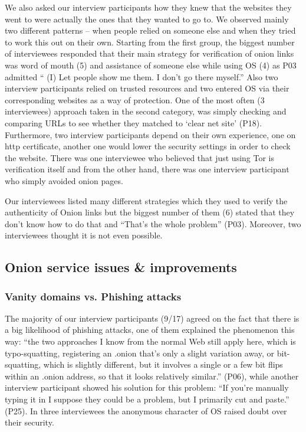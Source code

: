 We also asked our interview participants how they knew that the websites they went to were actually the ones that they wanted to go to.  We observed mainly two different patterns – when people relied on someone else and when they tried to work this out on their own. Starting from the first group, the biggest number of interviewees responded that their main strategy for verification of onion links was word of mouth (5) and assistance of someone else while using OS (4) as P03 admitted “ (I) Let people show me them. I don't go there myself.” Also two interview participants relied on trusted resources and two entered OS via their corresponding websites as a way of protection. One of the most often (3 interviewees) approach taken in the second category, was simply checking and comparing URLs to see whether they matched to ‘clear net site’ (P18). Furthermore, two interview participants depend on their own experience, one on http certificate, another one would lower the security settings in order to check the website. There was one interviewee who believed that just using Tor is verification itself and from the other hand, there was one interview participant who simply avoided onion pages.

Our interviewees listed many different strategies which they used to verify the authenticity of Onion links but the biggest number of them (6) stated that they don’t know how to do that and “That’s the whole problem” (P03). Moreover, two interviewees thought it is not even possible.


\subsection{Onion service issues \& improvements}
\label{sec:improve}

\subsubsection{Vanity domains vs. Phishing attacks}
The majority of our interview participants (9/17) agreed on the fact that there is a big likelihood of phishing attacks, one of them explained the phenomenon this way: “the two approaches I know from the normal Web still apply here, which is typo-squatting, registering an .onion that's only a slight variation away, or bit-squatting, which is slightly different, but it involves a single or a few bit flips within an .onion address, so that it looks relatively similar.” (P06), while another interview participant showed his solution for this problem: “If you're manually typing it in I suppose they could be a problem, but I primarily cut and paste.” (P25). In three interviewees the anonymous character of OS raised doubt over their security.

